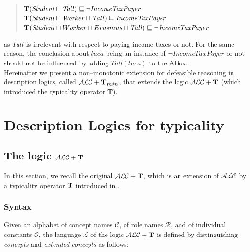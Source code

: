 \documentclass[a4paper, 11pt, oneside]{duthesis}
\newcommand{\tip}{{\bf T}}
\newcommand{\alc}{\mathcal{ALC}}
\newcommand{\alct}{\mathcal{ALC}+\tip}
\newcommand{\alctmin}{\mathcal{ALC}+\tip_{\mbox{\em min}}}
\newcommand{\sqset}{\sqsubseteq}
\newcommand{\mint}{\sqcap}
\newcommand{\elle} {\mathcal{L}}
\begin{document}
\begin{quote}
$\tip (\mathit{Student} \mint \mathit{Tall}) \sqset \mathit{\neg IncomeTaxPayer}$\\
$\tip (\mathit{Student} \mint \mathit{Worker} \mint \mathit{Tall})  \sqset \mathit{IncomeTaxPayer}$ \\
$\tip (\mathit{Student} \mint Worker \mint Erasmus \mint \mathit{Tall})  \sqset \mathit{\neg IncomeTaxPayer}$
\end{quote}

\noindent as  $\mathit{Tall}$ is irrelevant with respect to paying income taxes or not. For the same reason, the conclusion about $\mathit{luca}$ being an instance of $\neg IncomeTaxPayer$ or not should not be influenced by adding $\mathit{Tall}(\mathit{luca})$ to the ABox.\\

Hereinafter we present a non--monotonic extension for defeasible reasoning in description logics, called $\alctmin$, that extends the logic $\alct$ (which introduced the typicality operator \tip).

\newpage


\chapter{Description Logics for typicality}\label{dlt}

\section{The logic $\alct$}\label{alct}


In this section, we recall the original $\alct$, which is an extension of $\alc$ by a typicality operator $\tip$ introduced in \cite{FI09}.

\subsection{Syntax}
Given an alphabet of concept names $\mathcal{C}$, of role names $\mathcal{R}$, and of individual constants $\mathcal{O}$, the language $\elle$ of the logic $\alct$ is defined by distinguishing \emph{concepts} and \emph{extended concepts} as follows:
\end{document}
